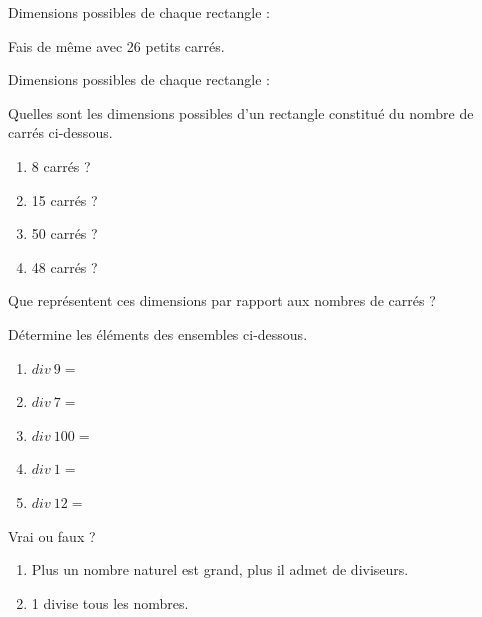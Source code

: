 \documentclass[../../syllabus_1.tex]{subfiles}
\begin{document}
Dimensions possibles de chaque rectangle : 

Fais de même avec 26 petits carrés.
\begin{center}
\end{center}

Dimensions possibles de chaque rectangle : 

\newpage
\begin{exercise}
      Quelles sont les dimensions possibles d'un rectangle constitué du nombre de carrés ci-dessous.
      \begin{enumerate}[itemsep=1em]
            \item 8 carrés ?
            \item 15 carrés ?
            \item 50 carrés ?
            \item 48 carrés ?
      \end{enumerate}
\end{exercise}

\medbreak
Que représentent ces dimensions par rapport aux nombres de carrés ?

\vfill

\begin{exercise}
      Détermine les éléments des ensembles ci-dessous.
      \begin{enumerate}[cols=2, itemsep=3em]
            \item \(div~9 = \)
            \item \(div~7 = \)
            \item \(div~100 = \)
            \item \(div~1 = \)
            \item \(div~12 = \)
      \end{enumerate}
\end{exercise}

\begin{exercise}
      Vrai ou faux ?
      \begin{enumerate}[itemsep=1cm]
            \item Plus un nombre naturel est grand, plus il admet de diviseurs.
            \item 1 divise tous les nombres.
      \end{enumerate}
\end{exercise}
\end{document}
